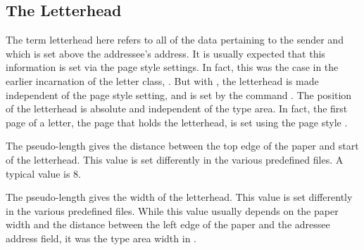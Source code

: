 \subsection{The Letterhead}
\label{sec:scrlttr2.firstHead}
%

The term letterhead here refers to all of the data pertaining to the
sender and which is set above the addressee's address. It is usually
expected that this information is set via the page style settings. In
fact, this was the case in the earlier incarnation of the letter
class, . But with , the letterhead is
made independent of the page style setting, and is set by the command
.
\iftrue The position of the letterhead is absolute and independent of
the type area. In fact, the first page of a letter, the page that
holds the letterhead, is set using the page style .  \fi

\begin{Declaration}
\end{Declaration}
%
The pseudo-length  gives the distance between
the top edge of the paper and start of the letterhead. This value is
set differently in the various predefined  files. A typical
value is 8.
%

\begin{Declaration}
\end{Declaration}
%
The pseudo-length  gives the width of the
letterhead. This value is set differently in the various predefined
 files. While this value usually depends on the paper width
and the distance between the left edge of the paper and the adressee
address field, it was the type area width in .
%
%


